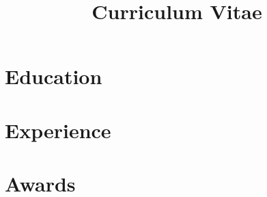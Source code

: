 \documentclass[11pt,a4paper,sans]{moderncv} %
\title{Curriculum Vitae}
\begin{document}

%
%
%
%
%
%


\makecvtitle %


\section{Education}




\section{Experience}




\section{Awards}
\end{document}
